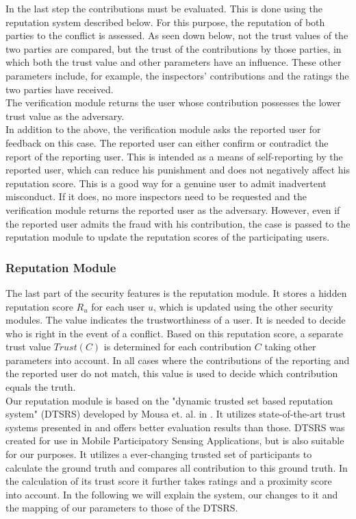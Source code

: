 \documentclass[
a4paper,     %
titlepage,   %
14pt         %
]{scrartcl}  %
\theoremstyle{mystyle}
\begin{document}
In the last step the contributions must be evaluated. This is done using the reputation system described below. For this purpose, the reputation of both parties to the conflict is assessed. As seen down below, not the trust values of the two parties are compared, but the trust of the contributions by those parties, in which both the trust value and other parameters have an influence. These other parameters include, for example, the inspectors' contributions and the ratings the two parties have received. \\

The verification module returns the user whose contribution possesses the lower trust value as the adversary. \\

In addition to the above, the verification module asks the reported user for feedback on this case. The reported user can either confirm or contradict the report of the reporting user. This is intended as a means of self-reporting by the reported user, which can reduce his punishment and does not negatively affect his reputation score. This is a good way for a genuine user to admit inadvertent misconduct. If it does, no more inspectors need to be requested and the verification module returns the reported user as the adversary. However, even if the reported user admits the fraud with his contribution, the case is passed to the reputation module to update the reputation scores of the participating users.

\subsubsection{Reputation Module} The last part of the security features is the reputation module. It stores a hidden reputation score $R_u$ for each user $u$, which is updated using the other security modules. The value indicates the trustworthiness of a user. It is needed to decide who is right in the event of a conflict. Based on this reputation score, a separate trust value $Trust(C)$ is determined for each contribution $C$ taking other parameters into account. In all cases where the contributions of the reporting and the reported user do not match, this value is used to decide which contribution equals the truth. \\

Our reputation module is based on the "dynamic trusted set based reputation system" (DTSRS) developed by Mousa et. al. in \cite{mousa2017reputation}. It utilizes state-of-the-art trust systems presented in \cite{mousa2015trust} and offers better evaluation results than those. DTSRS was created for use in Mobile Participatory Sensing Applications, but is also suitable for our purposes. It utilizes a ever-changing trusted set of participants to calculate the ground truth and compares all contribution to this ground truth. In the calculation of its trust score it further takes ratings and a proximity score into account. In the following we will explain the system, our changes to it and the mapping of our parameters to those of the DTSRS. \\
\end{document}
